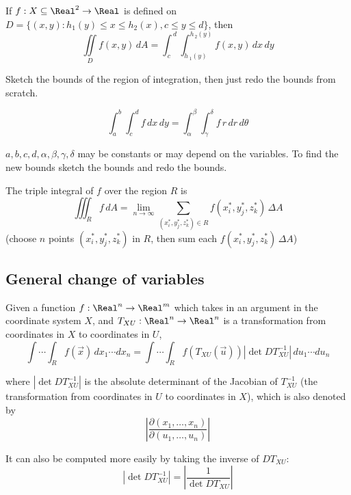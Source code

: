 \begin{theorem}
  If $f : X \subseteq \Real^2 \to \Real$ is defined on $D = \{ (x, y) : h_1(y) \leq x \leq h_2(x), c \leq y \leq d \}$, then
  \[
    \iint\limits_{D}{{f\left( {x,y} \right)\,dA}} = \int_{{\,c}}^{{\,d}}{{\int_{{h{\,_1}\left( y \right)}}^{{{h_{\,2}}\left( y \right)}}{{f\left( {x,y} \right)\,dx}}\,dy}}
  \]
\end{theorem}

\begin{theorem}
  Sketch the bounds of the region of integration, then just redo the bounds from scratch.
\end{theorem}

\begin{theorem}
  \[
    \int_a^b \int_c^d f \,dx \,dy = \int_\alpha^\beta \int_\gamma^\delta f \,r \,dr \,d\theta
  \]

  $a, b, c, d, \alpha, \beta, \gamma, \delta$ may be constants or may depend on the variables. To find the new bounds sketch the bounds and redo the bounds.
\end{theorem}

\begin{definition}
  The triple integral of $f$ over the region $R$ is
  \[
    \iiint_{R} f \,dA = \lim_{n \to \infty} \sum_{(x_i^*, y_j^*, z_k^*) \in R} {f\left( {x_i^*,y_j^*, z_k^*} \right)\,\Delta A}
  \]
  (choose $n$ points $(x_i^*, y_j^*, z_k^*)$ in $R$, then sum each $f\left( {x_i^*,y_j^*, z_k^*} \right)\,\Delta A$)
\end{definition}

\subsection{General change of variables}

\begin{theorem}
  Given a function $f : \Real^n \to \Real^m$ which takes in an argument in the coordinate system $X$, and $T_{XU} : \Real^n \to \Real^n$ is a transformation from coordinates in $X$ to coordinates in $U$,
  \[
    {\int \! \cdots \! \int_R} f(\vec{x}) \,dx_1 \cdots dx_n = {\int \! \cdots \! \int_R} f(T_{XU} (\vec{u})) \left| \det DT_{XU}^{-1} \right| \,du_1 \cdots du_n
  \]

  where $\left| \det DT_{XU}^{-1} \right|$ is the absolute determinant of the Jacobian of $T_{XU}^{-1}$ (the transformation from coordinates in $U$ to coordinates in $X$), which is also denoted by
  \[
    \left| \frac{\partial(x_1, \ldots, x_n)}{\partial(u_1, \ldots, u_n)} \right|
  \]

  It can also be computed more easily by taking the inverse of $DT_{XU}$:
  \[
    \left| \det DT_{XU}^{-1} \right| = \left| \frac{1}{\det DT_{XU}} \right|
  \]
\end{theorem}

